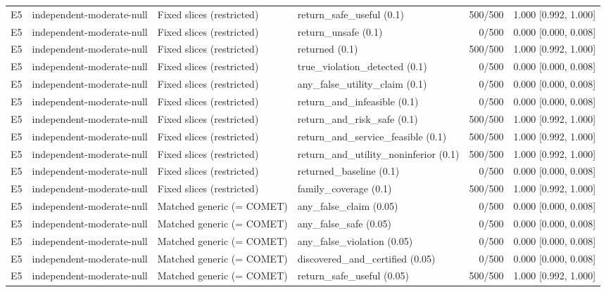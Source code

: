 \begin{longtable}{p{.04\linewidth}p{.18\linewidth}p{.19\linewidth}p{.16\linewidth}r p{.21\linewidth}}
E5 & independent-moderate-null & Fixed slices (restricted) & return\_safe\_useful (0.1) & 500/500 & 1.000 [0.992, 1.000]\\
E5 & independent-moderate-null & Fixed slices (restricted) & return\_unsafe (0.1) & 0/500 & 0.000 [0.000, 0.008]\\
E5 & independent-moderate-null & Fixed slices (restricted) & returned (0.1) & 500/500 & 1.000 [0.992, 1.000]\\
E5 & independent-moderate-null & Fixed slices (restricted) & true\_violation\_detected (0.1) & 0/500 & 0.000 [0.000, 0.008]\\
E5 & independent-moderate-null & Fixed slices (restricted) & any\_false\_utility\_claim (0.1) & 0/500 & 0.000 [0.000, 0.008]\\
E5 & independent-moderate-null & Fixed slices (restricted) & return\_and\_infeasible (0.1) & 0/500 & 0.000 [0.000, 0.008]\\
E5 & independent-moderate-null & Fixed slices (restricted) & return\_and\_risk\_safe (0.1) & 500/500 & 1.000 [0.992, 1.000]\\
E5 & independent-moderate-null & Fixed slices (restricted) & return\_and\_service\_feasible (0.1) & 500/500 & 1.000 [0.992, 1.000]\\
E5 & independent-moderate-null & Fixed slices (restricted) & return\_and\_utility\_noninferior (0.1) & 500/500 & 1.000 [0.992, 1.000]\\
E5 & independent-moderate-null & Fixed slices (restricted) & returned\_baseline (0.1) & 0/500 & 0.000 [0.000, 0.008]\\
E5 & independent-moderate-null & Fixed slices (restricted) & family\_coverage (0.1) & 500/500 & 1.000 [0.992, 1.000]\\
E5 & independent-moderate-null & Matched generic (= COMET) & any\_false\_claim (0.05) & 0/500 & 0.000 [0.000, 0.008]\\
E5 & independent-moderate-null & Matched generic (= COMET) & any\_false\_safe (0.05) & 0/500 & 0.000 [0.000, 0.008]\\
E5 & independent-moderate-null & Matched generic (= COMET) & any\_false\_violation (0.05) & 0/500 & 0.000 [0.000, 0.008]\\
E5 & independent-moderate-null & Matched generic (= COMET) & discovered\_and\_certified (0.05) & 0/500 & 0.000 [0.000, 0.008]\\
E5 & independent-moderate-null & Matched generic (= COMET) & return\_safe\_useful (0.05) & 500/500 & 1.000 [0.992, 1.000]\\

\end{longtable}
